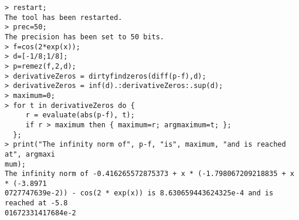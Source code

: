 \begin{center}\begin{minipage}{15cm}\begin{Verbatim}[frame=single]
> restart;
The tool has been restarted.
> prec=50;
The precision has been set to 50 bits.
> f=cos(2*exp(x));
> d=[-1/8;1/8];
> p=remez(f,2,d);
> derivativeZeros = dirtyfindzeros(diff(p-f),d);
> derivativeZeros = inf(d).:derivativeZeros:.sup(d);
> maximum=0;
> for t in derivativeZeros do {
     r = evaluate(abs(p-f), t);
     if r > maximum then { maximum=r; argmaximum=t; };
  };
> print("The infinity norm of", p-f, "is", maximum, "and is reached at", argmaxi
mum);
The infinity norm of -0.416265572875373 + x * (-1.798067209218835 + x * (-3.8971
0727747639e-2)) - cos(2 * exp(x)) is 8.630659443624325e-4 and is reached at -5.8
01672331417684e-2
\end{Verbatim}
\end{minipage}\end{center}
